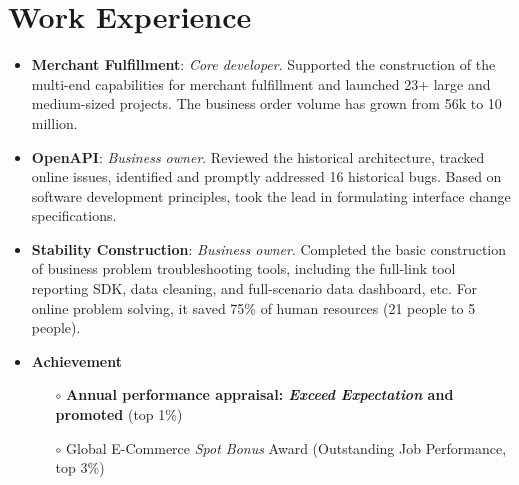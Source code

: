 \documentclass{resume}
\begin{document}
\section{Work Experience}
\begin{itemize}[parsep=0.2ex]
    \item \textbf{Merchant Fulfillment}: \textit{Core developer}. Supported the construction of the multi-end capabilities for 
    merchant fulfillment and launched 23+ large and medium-sized projects. The business order volume has grown from 56k to 
    10 million.
    \item \textbf{OpenAPI}: \textit{Business owner}. Reviewed the historical architecture, tracked online issues, identified 
    and promptly addressed 16 historical bugs. Based on software development principles, took the lead in formulating interface 
    change specifications.
    \item \textbf{Stability Construction}: \textit{Business owner}. Completed the basic construction of business problem 
    troubleshooting tools, including the full-link tool reporting SDK, data cleaning, and full-scenario data dashboard, etc. 
    For online problem solving, it saved 75\% of human resources (21 people to 5 people).
    \item \textbf{Achievement}
      \begin{itemize}
          \item[$\circ$] \textbf{Annual performance appraisal: \textit{Exceed Expectation} and promoted} (top 1\%)
          \item[$\circ$] Global E-Commerce \textit{Spot Bonus} Award (Outstanding Job Performance, top 3\%)
      \end{itemize}
\end{itemize}
\end{document}
